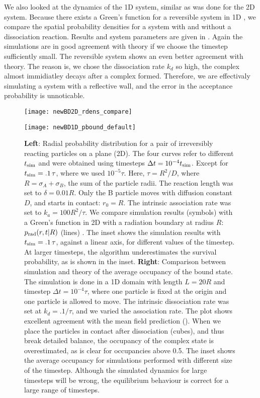 We also looked at the dynamics of the 1D system, similar as was done for the 2D system. Because there exists a Green's function for a reversible system in 1D \cite{Agmon1984,Kim2001}, we compare the spatial probability densities for a system with and without a dissociation reaction. Results and system parameters are given in . Again the simulations are in good agreement with theory if we choose the timestep sufficiently small. The reversible system shows an even better agreement with theory. The reason is, we chose the dissociation rate $k_d$ so high, the complex almost immidiatley decays after a complex formed. Therefore, we are effectivaly simulating a system with a reflective wall, and the error in the acceptance probability is unnoticable.

\begin{figure}[ht]
\begin{minipage}[ht]{.5\linewidth}
\centering
\texttt{[image: newBD2D\_rdens\_compare]}
\end{minipage}
\begin{minipage}[ht]{.5\linewidth}
\centering
\texttt{[image: newBD1D\_pbound\_default]}
\end{minipage}
\caption{ {\bf Left}: Radial probability distribution for a pair of irreversibly reacting particles on a plane (2D). The four curves refer to different $t_{\rm sim}$ and were obtained using timesteps  $\Delta t = 10^{-4} t_{\rm sim}$. Except for $t_{\rm sim} = .1\,\tau$, where we used $10^{-5} \tau$. Here, $\tau = R^2/D$, where $R=\sigma_A+\sigma_B$, the sum of the particle radii. The reaction length was set to $\delta=0.01 R$. Only the B particle moves with diffusion constant $D$, and starts in contact: $r_0=R$. The intrinsic association rate was set to $k_a = 100 R^2/\tau$. We compare simulation results (symbols) with a Green's function in 2D with a radiation boundary at radius $R$: $p_{\rm rad}(r,t|R)$ (lines) \cite{Beck1992}. The inset shows the simulation results with $t_{\rm sim} = .1\,\tau$, against a linear axis, for different values of the timestep. At larger timesteps, the algorithm underestimates the survival probability, as is shown in the inset.
{\bf Right}: Comparison between simulation and theory of the average occupancy of the bound state. The simulation is done in a 1D domain with length $L=20 R$ and timestep $\Delta t = 10^{-4} \tau$, where one particle is fixed at the origin and one particle is allowed to move. The intrinsic dissociation rate was set at $k_d=.1/\tau$, and we varied the association rate. The plot shows excellent agreement with the mean field prediction (). When we place the particles in contact after dissociation (cubes), and thus break detailed balance, the occupancy of the complex state is overestimated, as is clear for occupancies above 0.5. The inset shows the average occupancy for simulations performed with different size of the timestep. Although the simulated dynamics for large timesteps will be wrong, the equilibrium behaviour is correct for a large range of timesteps.}
\end{figure}

